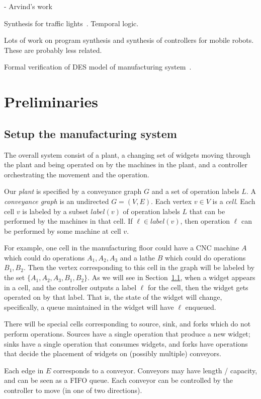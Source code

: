\documentclass[9pt,conference, compsocconf]{IEEEtran}
\begin{document}
- Arvind's work

Synthesis for traffic lights~\cite{coogan2017formal}.
Temporal logic.

Lots of work on program synthesis and synthesis of controllers for mobile robots. These are probably less related.


Formal verification of DES model of manufacturing system~\cite{ZhangKLMA13}.

\section{Preliminaries}
\label{sec:prelim}

\subsection{Setup the manufacturing system}
The overall system consist of a plant, a changing set of widgets moving through the plant and being operated on by the machines in the plant, and a controller orchestrating the movement and the operation. 

Our {\em plant} is specified by a conveyance graph $G$ and a set of operation labels $L$. 
A {\em conveyance graph\/} is an undirected $G =(V,E)$. Each vertex $v \in V$ is a {\em cell\/}. 
%
Each cell $v$ is labeled by a subset $\mathit{label}(v)$ of operation labels $L$ that can be performed by the machines in that cell. If $\ell \in \mathit{label}(v)$, then operation $\ell$ can be performed by some machine at cell $v$. 

For example, one cell in the manufacturing floor could have a CNC machine $A$ which could do operations $A_1, A_2,A_3$ and a lathe $B$ which could do operations $B_1, B_2$. Then the vertex corresponding to this cell in the graph will be labeled by the set $\{A_1, A_2, A_3, B_1, B_2\}$. As we will see in Section~\ref{}, when a widget  appears in a cell, and the controller outputs a label $\ell$ for the cell, then the widget gets operated on by that label. That is, the state of the widget will change, specifically, a queue maintained in the widget will have $\ell$ enqueued. 

There will be special cells corresponding to source, sink, and forks which do not perform operations. Sources have a single operation that produce a  new widget; sinks have a single operation that consumes widgets, and forks have operations that decide the placement of widgets on (possibly multiple) conveyors.  

%
%
Each edge in $E$ corresponds to a conveyor.
Conveyors may have length / capacity, and can be seen as a FIFO queue. Each conveyor can be controlled by the controller to move (in one of two directions).
\end{document}
